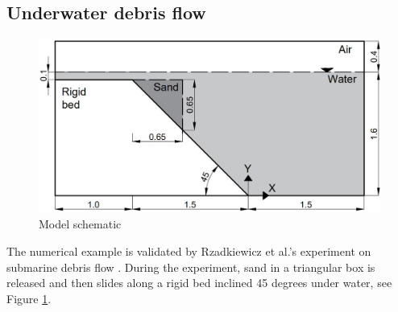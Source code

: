\documentclass[preprint,12pt]{elsarticle}
\begin{document}
\subsection{\textsf{Underwater debris flow}}
%
%
\begin{figure}[h]
\center
\includegraphics[scale=.3]{SandBoxscheme.jpg}
\caption{Model schematic}
\label{fig:SandBoxModel}
\end{figure}
%
%
The numerical example is validated by Rzadkiewicz et al.'s experiment on submarine debris flow \cite{Rzadkiewicz}. During the experiment, sand in a triangular box is released and then slides along a rigid bed inclined 45 degrees under water, see Figure \ref{fig:SandBoxModel}.\\
%
%
\end{document}
